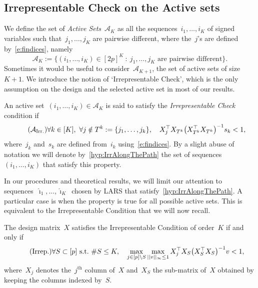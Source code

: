 \documentclass[final,numbib]{imaiai}%
\numberwithin{equation}{section}
\def\eq{\begin{equation}}
\def\qe{\end{equation}}
\def\cA{\mathcal{A}}
\renewcommand{\hat}{\widehat}
\newcommand{\<}{\langle}
\renewcommand{\>}{\rangle}
\newcommand{\1}{\mathds{1}}
\begin{document}
{\subsection{Irrepresentable Check on the Active sets}
\label{sec:Assumption}

We define the set of {\it Active Sets}~$\cA_K$ as all the  sequences~$i_1,\ldots,i_K$ of signed variables such that~$j_1,\ldots,j_K$ are pairwise different, where the~$j$'s are defined by~\eqref{e:findices}, namely 
\[
\cA_K:=\big\{(i_1,\ldots,i_K)\in[2p]^K\ :\ j_1,\ldots,  j_K\text{ are pairwise different}\big\}.
\]
Sometimes it would be useful to consider~$\cA_{K+1}$, the set of active sets of size~$K+1$.
We introduce the notion of `Irrepresentable Check', which is the only assumption on the design and the selected active set in most of our results.
  
   \begin{definition}\label{def:EIC}
An active set~$(i_1,\ldots,i_K)\in\cA_K$ is said to satisfy the {\it Irrepresentable Check} condition if 
\eq
\label{hyp:IrrAlongThePath}
\tag{${\cA}_{\mathrm{Irr.}}$}
\forall k\in[K],\ \forall j\notin { T^{k}}:=\{j_1,\ldots, j_k\},\quad X_j^\top X_{T^{k}}\big( X_{T^{k}}^\top  X_{T^{k}}\big)^{-1} s_{k}<1,
\qe
where~$j_k$ and~$s_k$ are defined from~$i_k$ using~\eqref{e:findices}.
By a slight abuse of notation we will  denote by~\eqref{hyp:IrrAlongThePath}  the set of sequences~$(i_1,\ldots,i_K)$ that satisfy this property.
\end{definition}


In our procedures and theoretical results, we will limit our attention to sequences~$\hat \imath_1,\ldots, \hat \imath_K\,$ chosen by LARS that  satisfy~\eqref{hyp:IrrAlongThePath}.
 A particular case  is when the  property is true for all possible active sets.
This is equivalent  to the Irrepresentable Condition that we will now recall.

\begin{definition}
The design matrix~$X$ satisfies the Irrepresentable Condition of order~$K$ if and only if 
\eq
\label{eq:Irr_matrix}
\tag{${\mathrm{Irrep.}}$}
\forall S\subset[p]\ \text{s.t.}\ \# S\leq K,\quad
\max_{j\in[p]\setminus S}\max_{||v||_\infty\leq1} X_j^\top X_S\big(X_S^\top X_S\big)^{-1}v<1,
\qe
where~$X_j$ denotes the~$j^{\text{th}}$ column of~$X$ and~$X_S$ the sub-matrix of~$X$ obtained by keeping the columns indexed by~$S$.
\end{definition}
 
}
\end{document}
